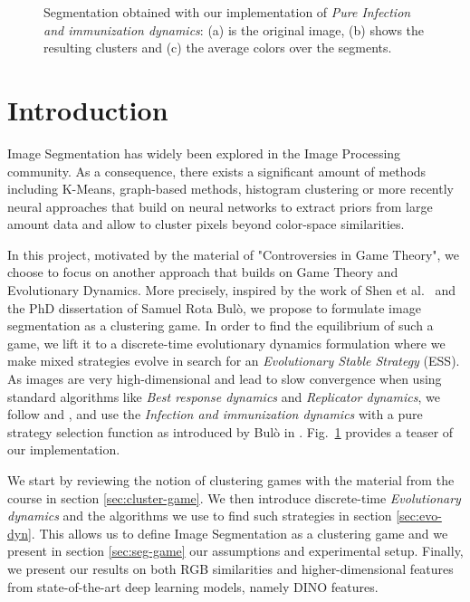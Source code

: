 \documentclass[11pt,a4paper]{article}
\begin{document}
\begin{figure}[H]
\begin{subfigure}[b]{0.3\textwidth}
        \caption{ }
    \end{subfigure}
       \caption{Segmentation obtained with our implementation of \textit{Pure Infection and immunization dynamics}: (a) is the original image, (b) shows the resulting clusters and (c) the average colors over the segments.}
       \label{fig:teaser}
\end{figure}

\section{Introduction}

Image Segmentation has widely been explored in the Image Processing community. As a consequence, there exists a significant amount of methods including K-Means, graph-based methods\cite{graph-segmentation}, histogram clustering\cite{histogram-clustering} or more recently neural approaches that build on neural networks to extract priors from large amount data\cite{panoptic-segmentation} and allow to cluster pixels beyond color-space similarities.

In this project, motivated by the material of "Controversies in Game Theory"\cite{course-gt}, we choose to focus on another approach that builds on Game Theory and Evolutionary Dynamics. More precisely, inspired by the work of Shen et al.~\cite{game-clustering} and the PhD dissertation of Samuel Rota Bulò\cite{bulo-thesis}, we propose to formulate image segmentation as a clustering game. In order to find the equilibrium of such a game, we lift it to a discrete-time evolutionary dynamics formulation where we make mixed strategies evolve in search for an \textit{Evolutionary Stable Strategy} (ESS). As images are very high-dimensional and lead to slow convergence when using standard algorithms like \textit{Best response dynamics} and \textit{Replicator dynamics}, we follow \cite{game-clustering} and \cite{bulo-thesis}, and use the \textit{Infection and immunization dynamics} with a pure strategy selection function as introduced by Bulò in \cite{inimdyn}. Fig.~\ref{fig:teaser} provides a teaser of our implementation.

We start by reviewing the notion of clustering games with the material from the course\cite{course-gt} in section \ref{sec:cluster-game}. We then introduce discrete-time \textit{Evolutionary dynamics} and the algorithms we use to find such strategies in section \ref{sec:evo-dyn}. This allows us to define Image Segmentation as a clustering game and we present in section \ref{sec:seg-game} our assumptions and experimental setup. Finally, we present our results on both RGB similarities and higher-dimensional features from state-of-the-art deep learning models, namely DINO features\cite{dino}.
\end{document}
